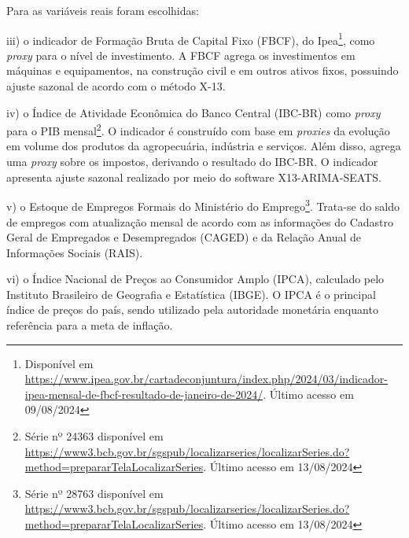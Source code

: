 Para as variáveis reais foram escolhidas: 

iii) o indicador de Formação Bruta de Capital Fixo (FBCF), do Ipea\footnote{Disponível em \url{https://www.ipea.gov.br/cartadeconjuntura/index.php/2024/03/indicador-ipea-mensal-de-fbcf-resultado-de-janeiro-de-2024/}. Último acesso em 09/08/2024}, como \textit{proxy} para o nível de investimento. A FBCF agrega os investimentos em máquinas e equipamentos, na construção civil e em outros ativos fixos, possuindo ajuste sazonal de acordo com o método X-13.

iv) o Índice de Atividade Econômica do Banco Central (IBC-BR) como \textit{proxy} para o PIB mensal\footnote{Série nº 24363 disponível em \url{https://www3.bcb.gov.br/sgspub/localizarseries/localizarSeries.do?method=prepararTelaLocalizarSeries}. Último acesso em 13/08/2024}. O indicador é construído com base em \textit{proxies} da evolução em volume dos produtos da agropecuária, indústria e serviços. Além disso, agrega uma \textit{proxy} sobre os impostos, derivando o resultado do IBC-BR. O indicador apresenta ajuste sazonal realizado por meio do software X13-ARIMA-SEATS.

v) o Estoque de Empregos Formais do Ministério do Emprego\footnote{Série nº 28763 disponível em \url{https://www3.bcb.gov.br/sgspub/localizarseries/localizarSeries.do?method=prepararTelaLocalizarSeries}. Último acesso em 13/08/2024}. Trata-se do saldo de empregos com atualização mensal de acordo com as informações do Cadastro Geral de Empregados e Desempregados (CAGED) e da Relação Anual de Informações Sociais (RAIS).

vi) o Índice Nacional de Preços ao Consumidor Amplo (IPCA), calculado pelo Instituto Brasileiro de Geografia e Estatística (IBGE). O IPCA é o principal índice de preços do país, sendo utilizado pela autoridade monetária enquanto referência para a meta de inflação. 

